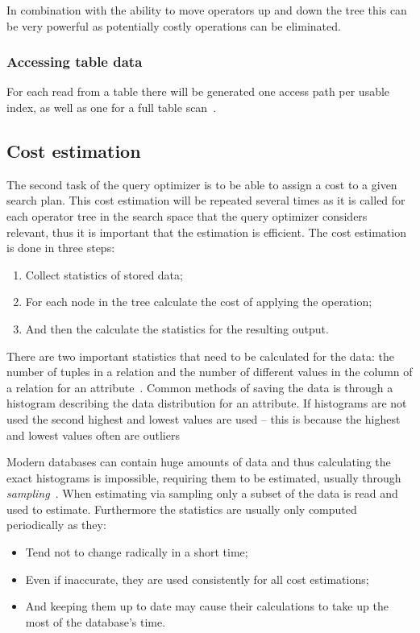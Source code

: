 In combination with the ability to move operators up and down the tree this can
be very powerful as potentially costly operations can be eliminated.

\subsubsection{Accessing table data}
For each read from a table there will be generated one access path per usable
index, as well as one for a full table scan~\cite[p.
827-829]{garcia-molina_2002_database_dstcb}.

\subsection{Cost estimation}
The second task of the query optimizer is to be able to assign a cost to a given
search plan. This cost estimation will be repeated several times as it is called
for each operator tree in the search space that the query optimizer considers
relevant, thus it is important that the estimation is efficient. The cost
estimation is done in three steps:
\begin{enumerate}
\item Collect statistics of stored data;
\item For each node in the tree calculate the cost of applying the operation;
\item And then the calculate the statistics for the resulting output.
\end{enumerate}

There are two important statistics that need to be calculated for the data: the
number of tuples in a relation and the number of different values in the column
of a relation for an attribute~\cite[p.
807-808]{garcia-molina_2002_database_dstcb}. Common methods of saving the data
is through a histogram describing the data distribution for an attribute. If
histograms are not used the second highest and lowest values are used – this is
because the highest and lowest values often are outliers

Modern databases can contain huge amounts of data and thus calculating the exact
histograms is impossible, requiring them to be estimated, usually through
\textit{sampling}~\cite[p. 807-808]{garcia-molina_2002_database_dstcb}. When
estimating via sampling only a subset of the data is read and used to estimate.
Furthermore the statistics are usually only computed periodically as they:
\begin{itemize}
\item Tend not to change radically in a short time;
\item Even if inaccurate, they are used consistently for all cost estimations;
\item And keeping them up to date may cause their calculations to take up the
  most of the database's time.
\end{itemize}

